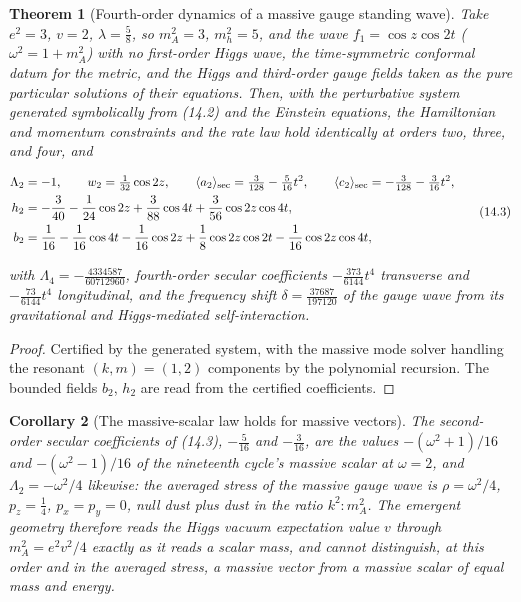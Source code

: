 \documentclass[11pt]{article}
\newtheorem{theorem}{Theorem}[section]
\newtheorem{corollary}[theorem]{Corollary}
\theoremstyle{remark}
\begin{document}
\begin{theorem}[Fourth-order dynamics of a massive gauge standing wave]
\label{thm:v20v11-wave}
Take \(e^2=3\), \(v=2\), \(\lambda=\tfrac58\), so \(m_A^2=3\),
\(m_h^2=5\), and the wave \(f_1=\cos z\cos2t\) (\(\omega^2=1+m_A^2\))
with no first-order Higgs wave, the time-symmetric conformal datum
for the metric, and the Higgs and third-order gauge fields taken as
the pure particular solutions of their equations.  Then, with the
perturbative system generated symbolically from (14.2) and the
Einstein equations, the Hamiltonian and momentum constraints and
the rate law hold identically at orders two, three, and four, and

\[
\begin{aligned}
 \Lambda_2&=-1,\qquad w_2=\tfrac1{32}\cos2z,\qquad
 \langle a_2\rangle_{\rm sec}=\tfrac3{128}-\tfrac5{16}t^2,\qquad
 \langle c_2\rangle_{\rm sec}=-\tfrac3{128}-\tfrac3{16}t^2,\\
 h_2&=-\frac3{40}-\frac1{24}\cos2z+\frac3{88}\cos4t+\frac3{56}\cos2z\cos4t,\\
 b_2&=\frac1{16}-\frac1{16}\cos4t-\frac1{16}\cos2z+\frac1{8}\cos2z\cos2t-\frac1{16}\cos2z\cos4t,
\end{aligned}                                                          \tag{14.3}
\]

with \(\Lambda_4=-\tfrac{4334587}{60712960}\), fourth-order secular
coefficients \(-\tfrac{373}{6144}t^4\) transverse and
\(-\tfrac{73}{6144}t^4\) longitudinal, and the frequency shift
\(\delta=\tfrac{37687}{197120}\) of the gauge wave from its
gravitational and Higgs-mediated self-interaction.
\end{theorem}

\begin{proof}
Certified by the generated system, with the massive mode solver
handling the resonant \((k,m)=(1,2)\) components by the polynomial
recursion.  The bounded fields \(b_2\), \(h_2\) are read from the
certified coefficients.
\end{proof}

\begin{corollary}[The massive-scalar law holds for massive vectors]
\label{cor:v20v11-law}
The second-order secular coefficients of (14.3), \(-\tfrac5{16}\) and
\(-\tfrac3{16}\), are the values \(-(\omega^2+1)/16\) and
\(-(\omega^2-1)/16\) of the nineteenth cycle's massive scalar at
\(\omega=2\), and \(\Lambda_2=-\omega^2/4\) likewise: the averaged
stress of the massive gauge wave is \(\rho=\omega^2/4\), \(p_z=\tfrac14\),
\(p_x=p_y=0\), null dust plus dust in the ratio \(k^2:m_A^2\).  The
emergent geometry therefore reads the Higgs vacuum expectation value
\(v\) through \(m_A^2=e^2v^2/4\) exactly as it reads a scalar mass,
and cannot distinguish, at this order and in the averaged stress, a
massive vector from a massive scalar of equal mass and energy.
\end{corollary}
\end{document}

